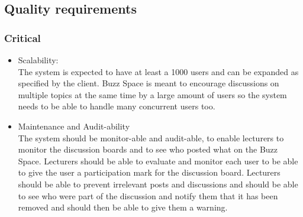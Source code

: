 
\subsection{Quality requirements}
	\subsubsection{Critical}
		\begin{itemize}
			\item Scalability: \\
			The system is expected to have at least a 1000 users and can be expanded as specified by the client. Buzz Space is meant to encourage discussions on multiple topics at the same time by a large amount of users so the system needs to be able to handle many concurrent users too.
			\item Maintenance and Audit-ability \\
			The system should be monitor-able and audit-able, to enable lecturers to monitor the discussion boards and to see who posted what on the Buzz Space. Lecturers should be able to evaluate and monitor each user to be able to give the user a participation mark for the discussion board. Lecturers should be able to prevent irrelevant posts and discussions and should be able to see who were part of the discussion and notify them that it has been removed and should then be able to give them a warning.
		\end{itemize}
